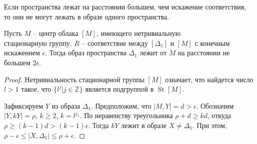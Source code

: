 \documentclass[11pt,twoside,draft
]{article}
\DeclareMathOperator{\St}{St}
\begin{document}
\begin{corollary}
	Если пространства лежат на расстоянии большем, чем
	искажение соответствия, то они не могут лежать
	в образе одного пространства.
\end{corollary}
\begin{theorem}
	Пусть $M$ -- центр облака $[M]$, имеющего нетривиальную
	\\стационарную группу. $R$ -- соответствие между $[\Delta_{1}]$ и $[M]$ с конечным
	искажением $\epsilon$. Тогда образ пространства $\Delta_{1}$ лежит от $M$ на
	расстоянии не большем $2\epsilon$.
	\label{thrmCenterImage}
\end{theorem}
\begin{proof}
	Нетривиальность стационарной группы $[M]$ означает, что найдется
	число $l > 1$ такое, что $\{l^{j}|j\in \mathbb{Z}\}$ является подгруппой в
	$\St{[M]}$.
	
	Зафиксируем $Y$ из образа $\Delta_{1}$.
	Предположим, что $|M, Y| = d > \epsilon$.  Обозначим
	$|Y, kY| = \rho$, $k \ge 2$, $k = l^{j_{1}}$. По неравенству треугольника $\rho + d \ge kd$,
	откуда $\rho \ge (k-1)d > (k-1)\epsilon$. Тогда $kY$ лежит в образе
	$X \ne \Delta_1$. При этом,
	$\rho - \epsilon \le |X, \Delta_1| \le \rho + \epsilon$. 
	

\end{proof}
\end{document}
